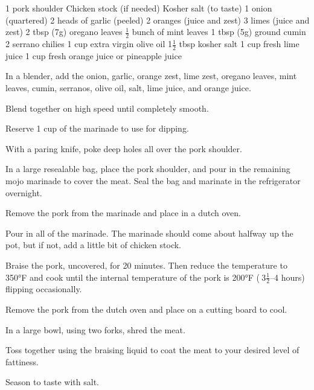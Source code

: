 \dishtype{}
\begin{ingreds}
    1 pork shoulder
    Chicken stock (if needed)
    Kosher salt (to taste)
    1 onion (quartered)
    2 heads of garlic (peeled)
    2 oranges (juice and zest)
    3 limes (juice and zest)
    2 tbsp (7g) oregano leaves
    $\frac{1}{2}$ bunch of mint leaves
    1 tbsp (5g) ground cumin
    2 serrano chilies
    1 cup extra virgin olive oil
    1$\frac{1}{2}$ tbsp kosher salt
    1 cup fresh lime juice
    1 cup fresh orange juice or pineapple juice
\end{ingreds}
\begin{method}
    In a blender, add the onion, garlic, orange zest, lime zest, oregano leaves, mint leaves, cumin, serranos, olive oil, salt, lime juice, and orange juice.\par
    Blend together on high speed until completely smooth.\par
    Reserve 1 cup of the marinade to use for dipping.\par
    With a paring knife, poke deep holes all over the pork shoulder.\par
    In a large resealable bag, place the pork shoulder, and pour in the remaining mojo marinade to cover the meat. Seal the bag and marinate in the refrigerator overnight.\par
    Remove the pork from the marinade and place in a dutch oven.\par
    Pour in all of the marinade. The marinade should come about halfway up the pot, but if not, add a little bit of chicken stock.\par
    Braise the pork, uncovered, for 20 minutes. Then reduce the temperature to 350°F and cook until the internal temperature of the pork is 200°F ($~$3$\frac{1}{2}$--4 hours) flipping occasionally.\par
    Remove the pork from the dutch oven and place on a cutting board to cool.\par
    In a large bowl, using two forks, shred the meat.\par
    Toss together using the braising liquid to coat the meat to your desired level of fattiness.\par
    Season to taste with salt.    
\end{method}